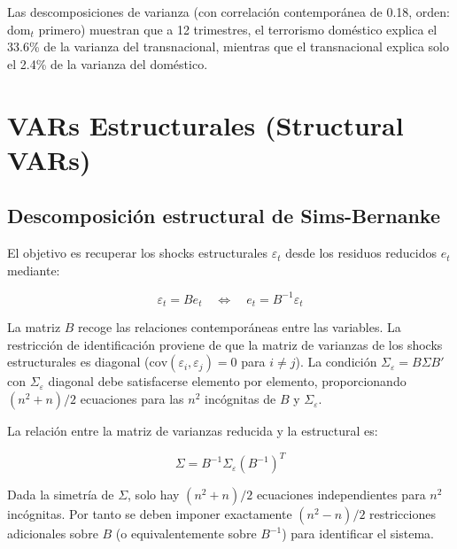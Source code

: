 \documentclass[12pt]{article}
\begin{document}
Las descomposiciones de varianza (con correlaci\'on contempor\'anea de 0.18, orden: dom$_t$ primero) muestran que a 12 trimestres, el terrorismo dom\'estico explica el 33.6\% de la varianza del transnacional, mientras que el transnacional explica solo el 2.4\% de la varianza del dom\'estico.

\section{VARs Estructurales (Structural VARs)}

\subsection{Descomposici\'on estructural de Sims-Bernanke}

El objetivo es recuperar los shocks estructurales $\varepsilon_t$ desde los residuos reducidos $e_t$ mediante:

\begin{equation}
\varepsilon_t = Be_t \quad \Leftrightarrow \quad e_t = B^{-1}\varepsilon_t
\end{equation}

\begin{intuicionmat}
La matriz $B$ recoge las relaciones contempor\'aneas entre las variables. La restricci\'on de identificaci\'on proviene de que la matriz de varianzas de los shocks estructurales es diagonal ($\text{cov}(\varepsilon_i, \varepsilon_j) = 0$ para $i \neq j$). La condici\'on $\Sigma_\varepsilon = B\Sigma B'$ con $\Sigma_\varepsilon$ diagonal debe satisfacerse elemento por elemento, proporcionando $(n^2+n)/2$ ecuaciones para las $n^2$ inc\'ognitas de $B$ y $\Sigma_\varepsilon$.
\end{intuicionmat}

La relaci\'on entre la matriz de varianzas reducida y la estructural es:

\begin{equation}
\Sigma = B^{-1}\Sigma_\varepsilon (B^{-1})^T
\end{equation}

\begin{intuicionmat}
Dada la simetr\'ia de $\Sigma$, solo hay $(n^2+n)/2$ ecuaciones independientes para $n^2$ inc\'ognitas. Por tanto se deben imponer exactamente $(n^2-n)/2$ restricciones adicionales sobre $B$ (o equivalentemente sobre $B^{-1}$) para identificar el sistema.
\end{intuicionmat}
\end{document}
